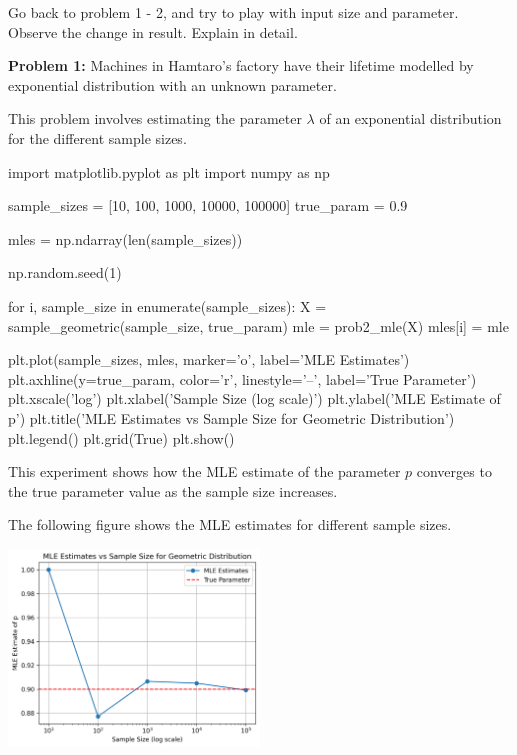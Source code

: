 \documentclass[a4paper, 10pt]{article}
\begin{document}
\newpage

\begin{problem}
Go back to problem 1 - 2, and try to play with input size and parameter.
Observe the change in result.
Explain in detail.
\end{problem}

\begin{subproblems}
    \item \textbf{Problem 1: } Machines in Hamtaro's factory have their lifetime modelled by exponential distribution with an unknown parameter.
\end{subproblems}

\begin{solution}
This problem involves estimating the parameter \( \lambda \) of an exponential distribution for the different sample sizes.
\begin{codingbox}
import matplotlib.pyplot as plt
import numpy as np

sample_sizes = [10, 100, 1000, 10000, 100000]
true_param = 0.9

mles = np.ndarray(len(sample_sizes))

np.random.seed(1)

for i, sample_size in enumerate(sample_sizes):
    X = sample_geometric(sample_size, true_param)
    mle = prob2_mle(X)
    mles[i] = mle

plt.plot(sample_sizes, mles, marker='o', label='MLE Estimates')
plt.axhline(y=true_param, color='r', linestyle='--', label='True Parameter')
plt.xscale('log')
plt.xlabel('Sample Size (log scale)')
plt.ylabel('MLE Estimate of p')
plt.title('MLE Estimates vs Sample Size for Geometric Distribution')
plt.legend()
plt.grid(True)
plt.show()
\end{codingbox}

This experiment shows how the MLE estimate of the parameter \( p \) converges to the true parameter value as the sample size increases.

\vspace{3mm}

The following figure shows the MLE estimates for different sample sizes.
\begin{center}
    \includegraphics[width=0.5\textwidth]{images/problem_7_1.png}
\end{center}
\end{solution}
\end{document}
